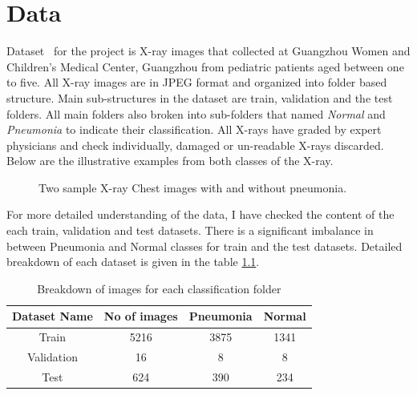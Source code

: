 \chapter{Data} \label{chap:data}
Dataset~\cite{dataset} for the project is X-ray images that collected at Guangzhou Women and Children’s Medical Center, Guangzhou from pediatric patients aged between one to five.
All X-ray images are in JPEG format and organized into folder based structure.
Main sub-structures in the dataset are train, validation and the test folders.
All main folders also broken into sub-folders that named \emph{Normal} and \emph{Pneumonia} to indicate their classification.
All X-rays have graded by expert physicians and check individually, damaged or un-readable X-rays discarded.
Below are the illustrative examples from both classes of the X-ray.

\begin{figure}[H]%
    \centering
    \qquad
    \caption{Two sample X-ray Chest images with and without pneumonia.}%
    \label{fig:sample}%
\end{figure}

For more detailed understanding of the data, I have checked the content of the each train, validation and test datasets. 
There is a significant imbalance in between Pneumonia and Normal classes for train and the test datasets.
Detailed breakdown of each dataset is given in the table \ref{table:dataset}.


\begin{table}[H]
    \centering
    \begin{tabular}{||c c c c||} 
    \hline
    Dataset Name & No of images & Pneumonia & Normal \\ [0.5ex] 
    \hline\hline
    Train & 5216 & 3875 & 1341 \\ 
    \hline
    Validation & 16 & 8 & 8 \\
    \hline
    Test & 624 & 390 & 234 \\ [1ex] 
    \hline
    \end{tabular}
    \caption{Breakdown of images for each classification folder}
    \label{table:dataset}
\end{table}



